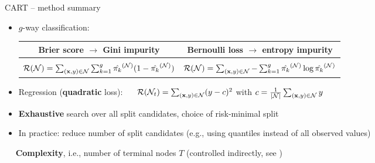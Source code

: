 \begin{frame}{CART -- method summary}
\begin{itemize}
\begin{itemize}
      \item $g$-way classification:
      \begin{tabular}{c |@{\vline}| c} 
 \textbf{Brier score} $\rightarrow$ \textbf{Gini} impurity & \textbf{Bernoulli} loss $\rightarrow$ \textbf{entropy} impurity \\ 
 \hline\\[-2ex]
 $\mathcal{R}(\mathcal{N}) = \sum_{(\mathbf{x},y) \in \mathcal{N}} \sum_{k=1}^g
      \hat{\pi_{k}}^{(\mathcal{N})} (1 - \hat{\pi_{k}}^{(\mathcal{N})} )$ & $\mathcal{R}(\mathcal{N}) = \sum_{(\mathbf{x},y) \in \mathcal{N}} - \sum_{k=1}^g
      \hat{\pi_{k}}^{(\mathcal{N})} \log \hat{\pi_{k}}^{(\mathcal{N})}$
\end{tabular}
      
    \item Regression (\textbf{quadratic} loss): ~~
    $\mathcal{R}(\mathcal{N}_t) = \sum_{(\mathbf{x},y) \in \mathcal{N}} (y - c)^2$ with $c = \frac{1}{|\mathcal{N}|} \sum_{(\mathbf{x},y) \in \mathcal{N}} y$
  \end{itemize}
\end{itemize}

\medskip


\begin{itemize}
  \item \textbf{Exhaustive} search over all split candidates, choice of 
  risk-minimal split
  \item In practice: reduce number of split candidates (e.g., using quantiles instead of all observed values)
\end{itemize}

\medskip

 ~~ \textbf{Complexity}, i.e., 
number of terminal nodes $T$ (controlled indirectly, see ) 

\end{frame}


